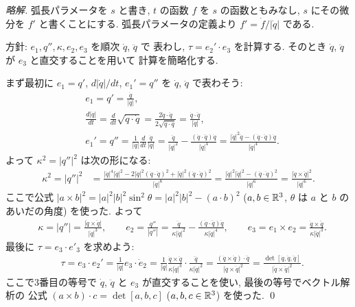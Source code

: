 \documentclass[12pt,twoside]{jarticle}
\newcommand\commentout[1]{#1}
\newcommand\commentout[1]{}
\begin{document}
\commentout{
\begin{proof}[略解]
 弧長パラメータを $s$ と書き, $t$ の函数 $f$ を $s$ の函数ともみなし, 
 $s$ にその微分を $f'$ と書くことにする. 
 弧長パラメータの定義より $f' = \dot f/|\dot q|$ である.

 方針: $e_1,q'',\kappa,e_2,e_3$ を順次 $\dot q$, $\ddot q$ で
 表わし, $\tau = e_2'\cdot e_3$ を計算する. 
 そのとき $\dot q$, $\ddot q$ が $e_3$ と直交することを用いて
 計算を簡略化する.

 まず最初に $e_1=q'$, $d|\dot q|/dt$, $e_1'=q''$ を $\dot q$, $\ddot q$ 
 で表わそう:
 \begin{align*}
  &
  e_1 = q' = \frac{\dot q}{|\dot q|},
  \\ &
  \frac{d|\dot q|}{dt}
  = \frac{d}{dt}\sqrt{\dot q\cdot \dot q}
  = \frac{2\dot q\cdot\ddot q}{2\sqrt{\dot q\cdot \dot q}}
  = \frac{\dot q\cdot\ddot q}{|\dot q|},
  \\ &
  e_1'=q''=\frac{1}{|\dot q|}\frac{d}{dt}\frac{\dot q}{|\dot q|}
  = \frac{\ddot q}{|\dot q|^2} 
  - \frac{(\dot q\cdot\ddot q)\dot q}{|\dot q|^4}
  = \frac{|\dot q|^2\ddot q - (\dot q\cdot\ddot q)\dot q}{|\dot q|^4}.
 \end{align*}
 よって $\kappa^2 = |q''|^2$ は次の形になる:
 \begin{align*}
  \kappa^2=|q''|^2
  &
  = \frac{|\dot q|^4|\ddot q|^2 
  - 2|\dot q|^2(\dot q\cdot \ddot q)^2 
  + |\dot q|^2(\dot q\cdot \ddot q)^2}{|\dot q|^8}
  = \frac{|\dot q|^2|\ddot q|^2-(\dot q\cdot \ddot q)^2}{|\dot q|^6}
  = \frac{|\dot q\times \ddot q|^2}{|\dot q|^6}.
 \end{align*}
 ここで公式 $|a\times b|^2=|a|^2|b|^2\sin^2\theta=|a|^2|b|^2-(a\cdot b)^2$
 ($a,b\in{\mathbb R}^3$, $\theta$ は $a$ と $b$ のあいだの角度) を使った. よって
 \begin{align*}
  &
  \kappa = |q''| = \frac{|\dot q\times \ddot q|}{|\dot q|^3},
  \qquad
  e_2 = \frac{q''}{|q''|} 
  = \frac{\ddot q}{\kappa|\dot q|^2} 
  - \frac{(\dot q\cdot\ddot q)\dot q}{\kappa|\dot q|^4},
  \qquad
  e_3=e_1\times e_2
  = \frac{\dot q\times \ddot q}{\kappa|\dot q|^3}.
 \end{align*}
 最後に $\tau=e_3\cdot e'_3$ を求めよう:
 \begin{align*}
  &
  \tau = e_3\cdot e_2' = \frac{1}{|\dot q|}e_3\cdot\dot e_2
  = 
  \frac{1}{|\dot q|} 
  \frac{\dot q\times \ddot q}{\kappa|\dot q|^3}
  \cdot
  \frac{\dddot q}{\kappa|\dot q|^2}
  = \frac{(\dot q\times \ddot q)\cdot \dddot q}{|\dot q\times \ddot q|^2}
  = \frac{\det[\dot q,\ddot q,\dddot q]}{|\dot q\times \ddot q|^2}.
 \end{align*}
 ここで3番目の等号で $\dot q$, $\ddot q$ と $e_3$ が直交することを使い, 
 最後の等号でベクトル解析の
 公式 $(a\times b)\cdot c=\det[a,b,c]$ ($a,b,c\in{\mathbb R}^3$) を使った.
 \qed
\end{proof}
}
\end{document}
